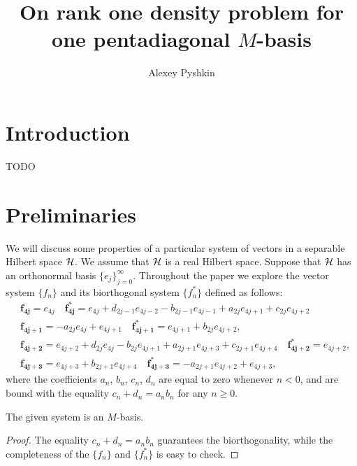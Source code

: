 \documentclass[12pt]{amsart}
\theoremstyle{case}
\begin{document}
\title{On rank one density problem for one pentadiagonal $M$-basis}
\author{Alexey Pyshkin}
\maketitle

\section{Introduction}
TODO
\section{Preliminaries}
  We will discuss some properties of a particular system of vectors in a separable Hilbert space $\cal{H}$.
  We assume that $\cal{H}$ is a real Hilbert space. 
  Suppose that $\cal{H}$ has an orthonormal basis $\{e_j\}_{j=0}^\infty$.
  Throughout the paper we explore the vector system $\{f_n\}$ and its biorthogonal system $\{f^*_n\}$ defined as follows:
  \begin{equation}
    \label{main-system}
    \begin{aligned}
      &\mathbf{f_{4j}} = e_{4j} \quad 
      \mathbf{f^*_{4j}} = e_{4j} + d_{2j - 1} e_{4j-2} - b_{2j-1} e_{4j-1} + a_{2j} e_{4j+1} + c_{2j} e_{4j+2}\\
      &\mathbf{f_{4j+1}} = -a_{2j} e_{4j} + e_{4j+1} \quad 
      \mathbf{f^*_{4j+1}} = e_{4j+1} + b_{2j} e_{4j+2},\\
      &\mathbf{f_{4j+2}} = e_{4j+2} + d_{2j} e_{4j} - b_{2j} e_{4j+1} + a_{2j+1} e_{4j+3} + c_{2j+1} e_{4j+4}\quad
      \mathbf{f^*_{4j+2}} = e_{4j+2},\\
      &\mathbf{f_{4j+3}} = e_{4j+3} + b_{2j+1} e_{4j+4}\quad
      \mathbf{f^*_{4j+3}} = -a_{2j+1} e_{4j+2} + e_{4j+3},
    \end{aligned}
  \end{equation}
    where the coefficients $a_n$, $b_n$, $c_n$, $d_n$ are equal to zero whenever $n < 0$, and are bound with the equality
      $c_n + d_n = a_n b_n$ for any $n \geq 0$. 
  \begin{prop}
    The given system is an $M$-basis.
  \end{prop}
  \begin{proof}
    The equality $c_n + d_n = a_n b_n$ guarantees the bi\-orthogonality,
      while the completeness of the $\{f_n\}$ and $\{f_n^*\}$ is easy to check.
  \end{proof}
\end{document}
